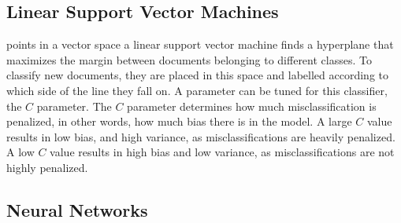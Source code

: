 



\subsection{Linear Support Vector Machines}\label{bg:svm}

 points in a vector space   a linear support vector machine   finds a hyperplane that maximizes the margin between documents belonging to different classes. To classify new documents, they are placed in this space and labelled according to which side of the line they fall on. A parameter can be tuned for this classifier, the $C$ parameter. The $C$ parameter determines how much misclassification is penalized, in other words, how much bias there is in the model. A large $C$ value results in low bias, and high variance, as misclassifications are heavily penalized. A low $C$ value results in high bias and low variance, as misclassifications are not highly penalized. 



\subsection{Neural Networks}\label{bg:nn}



